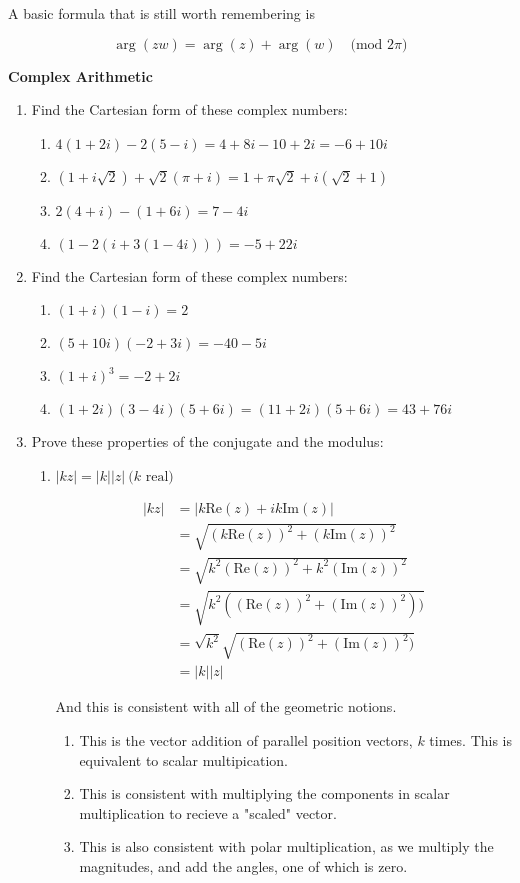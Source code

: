 \documentclass{book}
\begin{document}
\vspace{10pt}

A basic formula that is still worth remembering is

\[\arg(zw)=\arg(z)+\arg(w)\quad\mbox{(mod 2$\pi$)}\]

\vspace{10pt}

{\bf{}Complex Arithmetic}

\begin{enumerate}[label=\arabic*)]
\item Find the Cartesian form of these complex numbers:
\begin{enumerate}[label=(\alph*)]
\item $4(1+2i)-2(5-i)=4+8i-10+2i=-6+10i$
\item $(1+i\sqrt{2})+\sqrt{2}(\pi+i)=1+\pi\sqrt{2}+i(\sqrt{2}+1)$
\item $2(4+i)-(1+6i)=7-4i$
\item $(1-2(i+3(1-4i)))=-5+22i$
\end{enumerate}
\item Find the Cartesian form of these complex numbers:
\begin{enumerate}[label=(\alph*)]
\item $(1+i)(1-i)=2$
\item $(5+10i)(-2+3i)=-40-5i$
\item $(1+i)^3=-2+2i$
\item $(1+2i)(3-4i)(5+6i)=(11+2i)(5+6i)=43+76i$
\end{enumerate}
\newpage
\item Prove these properties of the conjugate and the modulus:
\begin{enumerate}[label=(\alph*)]
\item $|kz|=|k||z|\ \mbox{($k$ real)}$

\begin{align*}
|kz|&=|k\mbox{Re}(z)+ik\mbox{Im}(z)|\\
&=\sqrt{(k\mbox{Re}(z))^2+(k\mbox{Im}(z))^2}\\
&=\sqrt{k^2(\mbox{Re}(z))^2+k^2(\mbox{Im}(z))^2}\\
&=\sqrt{k^2((\mbox{Re}(z))^2+(\mbox{Im}(z))^2))}\\
&=\sqrt{k^2}\sqrt{(\mbox{Re}(z))^2+(\mbox{Im}(z))^2)}\\
&=|k||z|
\end{align*}

And this is consistent with all of the geometric notions.

\begin{enumerate}[label=\roman*)]
\item This is the vector addition of parallel position vectors, $k$ times. This is equivalent to scalar multipication.
\item This is consistent with multiplying the components in scalar multiplication to recieve a "scaled" vector.
\item This is also consistent with polar multiplication, as we multiply the magnitudes, and add the angles, one of which is zero.
\end{enumerate}


\end{enumerate}
\end{enumerate}
\end{document}
